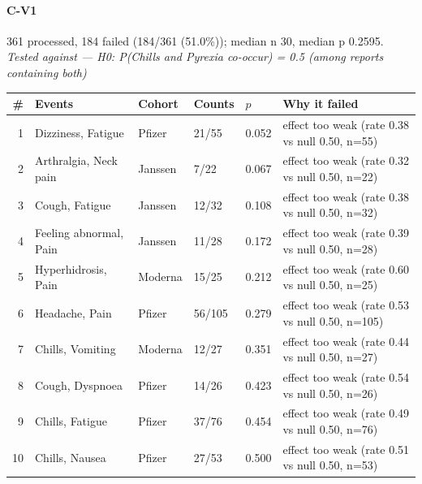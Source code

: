 \documentclass[11pt]{article}
\begin{document}
\paragraph{C-V1} 361 processed, 184 failed (184/361 (51.0\%)); median n 30, median p 0.2595. \emph{Tested against --- H0: P(Chills and Pyrexia co-occur) = 0.5 (among reports containing both)} \\
\begin{longtable}{@{}r p{3.9cm} p{2.5cm} l l p{4.4cm}@{}}
\toprule
\# & Events & Cohort & Counts & $p$ & Why it failed \\
\midrule \endhead
1 & Dizziness, Fatigue & Pfizer & 21/55 & 0.052 & effect too weak (rate 0.38 vs null 0.50, n=55) \\
2 & Arthralgia, Neck pain & Janssen & 7/22 & 0.067 & effect too weak (rate 0.32 vs null 0.50, n=22) \\
3 & Cough, Fatigue & Janssen & 12/32 & 0.108 & effect too weak (rate 0.38 vs null 0.50, n=32) \\
4 & Feeling abnormal, Pain & Janssen & 11/28 & 0.172 & effect too weak (rate 0.39 vs null 0.50, n=28) \\
5 & Hyperhidrosis, Pain & Moderna & 15/25 & 0.212 & effect too weak (rate 0.60 vs null 0.50, n=25) \\
6 & Headache, Pain & Pfizer & 56/105 & 0.279 & effect too weak (rate 0.53 vs null 0.50, n=105) \\
7 & Chills, Vomiting & Moderna & 12/27 & 0.351 & effect too weak (rate 0.44 vs null 0.50, n=27) \\
8 & Cough, Dyspnoea & Pfizer & 14/26 & 0.423 & effect too weak (rate 0.54 vs null 0.50, n=26) \\
9 & Chills, Fatigue & Pfizer & 37/76 & 0.454 & effect too weak (rate 0.49 vs null 0.50, n=76) \\
10 & Chills, Nausea & Pfizer & 27/53 & 0.500 & effect too weak (rate 0.51 vs null 0.50, n=53) \\
\bottomrule
\end{longtable}
\end{document}
